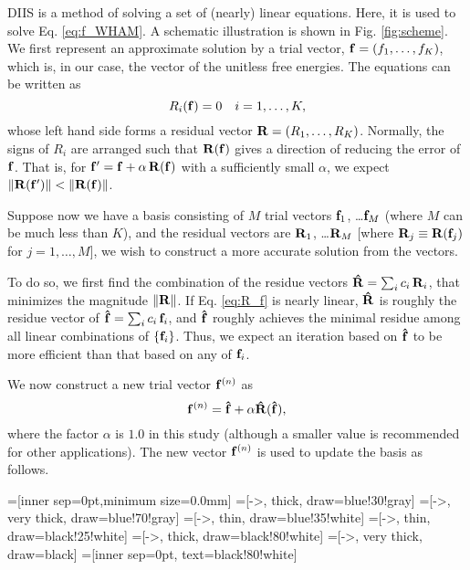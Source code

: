 \documentclass[aip,jcp,preprint,superscriptaddress]{revtex4-1}
\begin{document}
DIIS is a method of solving a set of
(nearly) linear equations\cite{
pulay1980, *pulay1982, *hamilton1986,
kovalenko1999, howard2011}.
%
Here, it is used
to solve Eq. \eqref{eq:f_WHAM}.
%
A schematic illustration
is shown in Fig. \ref{fig:scheme}.
%
We first represent an approximate solution
by a trial vector,
$\mathbf{f} = (f_1, \dots, f_K)$,
which is, in our case, the vector of
the unitless free energies.
%
The equations can be written as
%
\begin{equation}
  R_i(\mathbf{f}) = 0  \quad i = 1, \ldots, K,
  \label{eq:R_f}
\end{equation}
%
whose left hand side forms a residual vector
$\mathbf{R} = (R_1, \dots, R_K)$.
%
Normally, the signs of $R_i$ are arranged such that
$\mathbf{R}(\mathbf{f})$
gives a direction of reducing the error of $\mathbf{f}$.
%
That is,
for $\mathbf{f}' = \mathbf{f} + \alpha \, \mathbf{R}(\mathbf{f})$
with a sufficiently small $\alpha$,
we expect
%
$\| \mathbf{R}(\mathbf{f}') \| < \| \mathbf{R}(\mathbf{f}) \|$.



Suppose now we have a basis consisting of $M$ trial vectors
$\mathbf{f}_1$, \dots $\mathbf{f}_M$
(where $M$ can be much less than $K$),
%
and the residual vectors are
$\mathbf{R}_1$, \dots $\mathbf{R}_M$
[where $\mathbf{R}_j \equiv \mathbf{R}(\mathbf{f}_j)$
for $j = 1, \dots, M$],
%
we wish to construct a more accurate solution
from the vectors.



To do so, we first find the combination of the residue vectors
$\mathbf{\hat R} = \sum_i c_i \, \mathbf{R}_i$,
that minimizes the magnitude
$\| \mathbf{R} \|$.
%
If Eq. \eqref{eq:R_f} is nearly linear,
%
$\mathbf{\hat R}$
is roughly the residue vector of
$\mathbf{\hat f} = \sum_i c_i \, \mathbf{f}_i$,
and
$\mathbf{\hat f}$
roughly achieves the minimal residue
among all linear combinations of
$\{ \mathbf{f}_i \}$.
%
Thus,
we expect an iteration based on
$\mathbf{\hat f}$
to be more efficient than that
based on any of
$\mathbf{f}_i$.


We now construct a new trial vector $\mathbf{f}^{(n)}$ as
%
\begin{equation}
\mathbf{f}^{(n)}
=
\mathbf{\hat f}
+
\alpha \mathbf{\hat R}( \mathbf{\hat f} ),
\end{equation}
%
where the factor $\alpha$ is $1.0$ in this study
(although a smaller value is recommended
for other applications\cite{kovalenko1999, howard2011}).
%
The new vector $\mathbf{f}^{(n)}$
is used to update the basis as follows.





=[inner sep=0pt,minimum size=0.0mm]
=[->, thick, draw=blue!30!gray]
=[->, very thick, draw=blue!70!gray]
=[->, thin, draw=blue!35!white]
=[->, thin, draw=black!25!white]
=[->, thick, draw=black!80!white]
=[->, very thick, draw=black]
=[inner sep=0pt, text=black!80!white]
\end{document}
